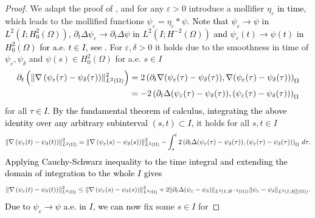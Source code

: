 \documentclass{m2an}
\newcommand{\1}{\mathds{1}}
\newcommand{\Om}{\Omega}
\newcommand{\revB}[1]{\textcolor{black}{#1}}
\DeclarePairedDelimiter{\norm}{\lVert}{\rVert}
\newcommand{\Oprod}[1]{\left(#1\right)_{\Omega}}
\theoremstyle{definition}
\begin{document}
\begin{proof}
    We adapt the proof of \cite[Section 5.9, Theorem 3]{Evans:2010}, and for any $\varepsilon > 0$ 
    introduce a mollifier $\eta_\varepsilon$ \revB{in time},
    which leads to the mollified functions $\psi_\varepsilon = \eta_\varepsilon * \psi$.
    \revB{Note that $\psi_\varepsilon \to \psi$ in $L^2(I;H^2_0(\Om))$,
        $\partial_t \Delta \psi_\varepsilon \to \partial_t \Delta \psi$ in $L^2(I;H^{-2}(\Om))$ and 
        $\psi_\varepsilon(t) \to \psi(t)$ in $H^2_0(\Om)$ for a.e. 
        $t \in I$, see \cite[Appendix C, Theorem 7]{Evans:2010}.
    }
    For $\varepsilon,\delta > 0$ it holds due to the smoothness in time of $\psi_\varepsilon,\psi_\delta$ and 
    $\psi(s) \in H^2_0(\Om)$ for a.e. $s \in I$
    \begin{align*}
        \partial_t \left(\norm{\nabla \left(\psi_\varepsilon(\tau) - \psi_\delta(\tau)\right)}_{L^2(\Om)}^2\right)
        &= 2\Oprod{\partial_t \nabla (\psi_\varepsilon(\tau) - \psi_\delta(\tau)),\nabla(\psi_\varepsilon(\tau) - \psi_\delta(\tau))}\\
        &= - 2\Oprod{\partial_t \Delta (\psi_\varepsilon(\tau) - \psi_\delta(\tau)),(\psi_\varepsilon(\tau) - \psi_\delta(\tau))}
    \end{align*}
    for all \revB{$\tau \in I$. By the fundamental theorem of calculus, integrating the above 
    identity over any arbitrary subinterval $(s,t)\subset I$,}
    it holds for all $s,t \in I$
    \begin{equation*}
        \norm{\nabla \left(\psi_\varepsilon(t) - \psi_\delta(t)\right)}_{L^2(\Om)}^2
        =
        \norm{\nabla \left(\psi_\varepsilon(s) - \psi_\delta(s)\right)}_{L^2(\Om)}^2
        - \int_s^t 2\Oprod{\partial_t \Delta (\psi_\varepsilon(\tau) - \psi_\delta(\tau)),(\psi_\varepsilon(\tau) - \psi_\delta(\tau))} \, d \tau.
    \end{equation*}
    \revB{Applying Cauchy-Schwarz inequality to the time integral and extending the domain of 
        integration to the whole $I$ gives
    \begin{equation*}
        \norm{\nabla \left(\psi_\varepsilon(t) - \psi_\delta(t)\right)}_{L^2(\Om)}^2
        \le
        \norm{\nabla \left(\psi_\varepsilon(s) - \psi_\delta(s)\right)}_{L^2(\Om)}^2
        + 2\norm{\partial_t \Delta (\psi_\varepsilon - \psi_\delta)}_{L^2(I;H^{-2}(\Om))}
            \norm{\psi_\varepsilon - \psi_\delta}_{L^2(I;H^2_0(\Om))}.
    \end{equation*}
    Due to $\psi_\varepsilon \to \psi$ a.e. in $I$, we can now} fix some $s \in I$ for 

\end{proof}
\end{document}
